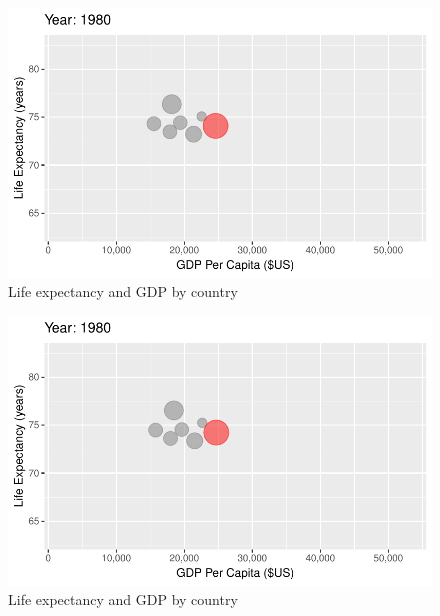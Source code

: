 \documentclass[
  letterpaper,
  DIV=11,
  numbers=noendperiod]{scrreport}
\theoremstyle{definition}
\theoremstyle{remark}
\begin{document}
\begin{figure}

{\centering \includegraphics{index_files/figure-pdf/fig-anim-country-51.pdf}

}

\caption{\label{fig-anim-country-51}Life expectancy and GDP by country}

\end{figure}

\begin{figure}

{\centering \includegraphics{index_files/figure-pdf/fig-anim-country-52.pdf}

}

\caption{\label{fig-anim-country-52}Life expectancy and GDP by country}

\end{figure}
\end{document}
